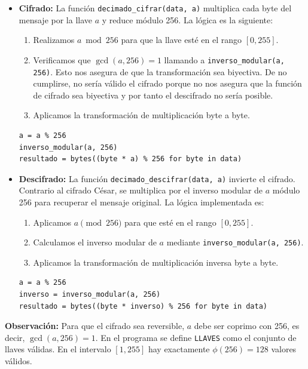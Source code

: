 \documentclass[12pt, a4paper]{article}
\begin{document}
\begin{itemize}
    \item \textbf{Cifrado:} La función \texttt{decimado\_cifrar(data, a)} multiplica cada byte
    del mensaje por la llave $a$ y reduce módulo 256. La lógica es la siguiente:
\begin{enumerate}
    \item Realizamos $a \bmod 256$ para que la llave esté en el rango $[0, 255]$.
    \item Verificamos que $\gcd(a, 256) = 1$ llamando a \texttt{inverso\_modular(a, 256)}. Esto nos 
            asegura de que la transformación sea biyectiva. De no cumplirse, no sería válido el cifrado
            porque no nos asegura que la función de cifrado sea biyectiva y por tanto el descifrado no
            sería posible.
    \item Aplicamos la transformación de multiplicación byte a byte.
\end{enumerate}

\begin{verbatim}
a = a % 256
inverso_modular(a, 256)
resultado = bytes((byte * a) % 256 for byte in data)
\end{verbatim}

    \item \textbf{Descifrado:} La función \texttt{decimado\_descifrar(data, a)} invierte el cifrado. Contrario
    al cifrado César, se multiplica por el inverso modular de $a$ módulo 256 para recuperar el mensaje original.
    La lógica implementada es:
    \begin{enumerate}
        \item Aplicamos $a \pmod {256}$ para que esté en el rango $[0, 255]$.
        \item Calculamos el inverso modular de $a$ mediante \texttt{inverso\_modular(a, 256)}.
        \item Aplicamos la transformación de multiplicación inversa byte a byte.
    \end{enumerate}

\begin{verbatim}
a = a % 256
inverso = inverso_modular(a, 256)
resultado = bytes((byte * inverso) % 256 for byte in data)
\end{verbatim}


\end{itemize}

\textbf{Observación:} Para que el cifrado sea reversible, $a$ debe ser coprimo con 256, es decir,
$\gcd(a, 256) = 1$. En el programa se define \texttt{LLAVES} como el conjunto de llaves válidas. En el 
intervalo $[1, 255]$ hay exactamente $\phi(256) = 128$ valores válidos.
\end{document}
